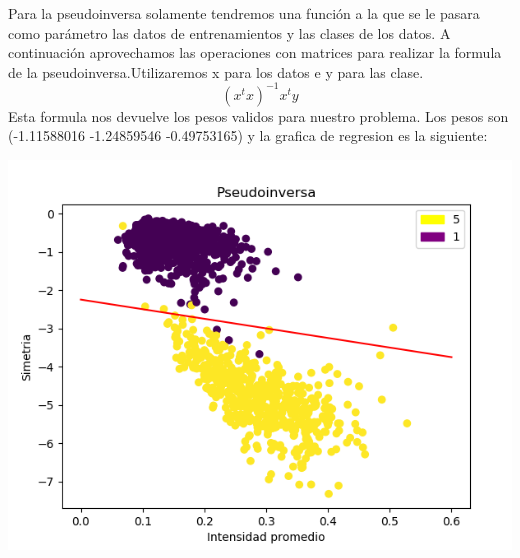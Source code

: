 \documentclass[titlepage]{article}
\begin{document}
	\normalfont
	\vspace{0.5cm}
	
	 Para la pseudoinversa solamente tendremos una función a la que se le pasara como parámetro las datos de entrenamientos y las clases de los datos. A continuación aprovechamos las operaciones con matrices para realizar la formula de la pseudoinversa.Utilizaremos x para los datos e y para las clase.
	 \begin{equation}
	  (x^tx)^{-1}x^ty
	 \end{equation}
	 Esta formula nos devuelve los pesos validos para nuestro problema.
	 Los pesos son (-1.11588016 -1.24859546 -0.49753165) y la grafica de regresion es la siguiente:
	 \begin{center}
	 	\includegraphics[scale=0.5]{pseudoinversa.png}
	 \end{center}
 
\end{document}
